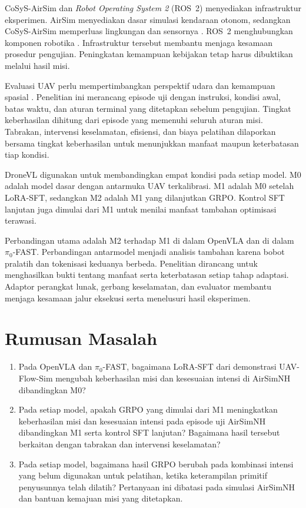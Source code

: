 CoSyS-AirSim dan \textit{Robot Operating System 2} (ROS~2) menyediakan infrastruktur eksperimen. AirSim menyediakan dasar simulasi kendaraan otonom, sedangkan CoSyS-AirSim memperluas lingkungan dan sensornya \citep{shah2017airsim,jansen2023cosysairsim}. ROS~2 menghubungkan komponen robotika \citep{macenski2022ros2}. Infrastruktur tersebut membantu menjaga kesamaan prosedur pengujian. Peningkatan kemampuan kebijakan tetap harus dibuktikan melalui hasil misi. %

Evaluasi UAV perlu mempertimbangkan perspektif udara dan kemampuan spasial \citep{zhang2025skyready}. Penelitian ini merancang episode uji dengan instruksi, kondisi awal, batas waktu, dan aturan terminal yang ditetapkan sebelum pengujian. Tingkat keberhasilan dihitung dari episode yang memenuhi seluruh aturan misi. Tabrakan, intervensi keselamatan, efisiensi, dan biaya pelatihan dilaporkan bersama tingkat keberhasilan untuk menunjukkan manfaat maupun keterbatasan tiap kondisi. %

DroneVL digunakan untuk membandingkan empat kondisi pada setiap model. M0 adalah model dasar dengan antarmuka UAV terkalibrasi. M1 adalah M0 setelah LoRA-SFT, sedangkan M2 adalah M1 yang dilanjutkan GRPO. Kontrol SFT lanjutan juga dimulai dari M1 untuk menilai manfaat tambahan optimisasi terawasi.

Perbandingan utama adalah M2 terhadap M1 di dalam OpenVLA dan di dalam $\pi_0$-FAST. Perbandingan antarmodel menjadi analisis tambahan karena bobot pralatih dan tokenisasi keduanya berbeda. Penelitian dirancang untuk menghasilkan bukti tentang manfaat serta keterbatasan setiap tahap adaptasi. Adaptor perangkat lunak, gerbang keselamatan, dan evaluator membantu menjaga kesamaan jalur eksekusi serta menelusuri hasil eksperimen.

\section{Rumusan Masalah}
\label{sec:rumusan_masalah}
\begin{enumerate}
    \item Pada OpenVLA dan $\pi_0$-FAST, bagaimana LoRA-SFT dari demonstrasi UAV-Flow-Sim mengubah keberhasilan misi dan kesesuaian intensi di AirSimNH dibandingkan M0?
    \item Pada setiap model, apakah GRPO yang dimulai dari M1 meningkatkan keberhasilan misi dan kesesuaian intensi pada episode uji AirSimNH dibandingkan M1 serta kontrol SFT lanjutan? Bagaimana hasil tersebut berkaitan dengan tabrakan dan intervensi keselamatan?
    \item Pada setiap model, bagaimana hasil GRPO berubah pada kombinasi intensi yang belum digunakan untuk pelatihan, ketika keterampilan primitif penyusunnya telah dilatih? Pertanyaan ini dibatasi pada simulasi AirSimNH dan bantuan kemajuan misi yang ditetapkan.
\end{enumerate}

